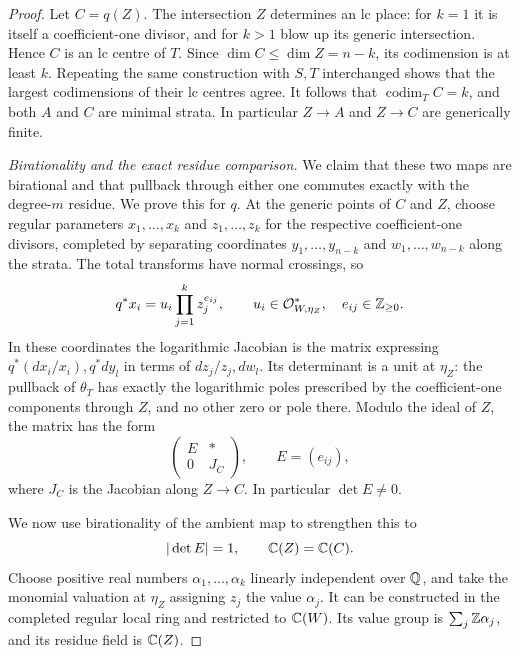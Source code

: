 \begin{proof}
 Let $C=q(Z)$.  The intersection $Z$ determines an lc place: for $k=1$
 it is itself a coefficient-one divisor, and for $k>1$ blow up its
 generic intersection.  Hence $C$ is an lc centre of $T$.  Since
 $\dim C\le\dim Z=n-k$, its codimension is at least $k$.
 Repeating the same construction with $S,T$ interchanged shows that
 the largest codimensions of their lc centres agree.  It follows that
 $\operatorname{codim}_T C=k$, and both $A$ and $C$ are minimal
 strata.  In particular $Z\to A$ and $Z\to C$ are generically finite.

 \emph{Birationality and the exact residue comparison.}
 We claim that these two maps are birational and that pullback through
 either one commutes exactly with the degree-$m$ residue.  We prove
 this for $q$.  At the generic points of $C$ and $Z$, choose regular
 parameters $x_1,\ldots,x_k$ and $z_1,\ldots,z_k$ for the respective
 coefficient-one divisors, completed by separating coordinates
 $y_1,\ldots,y_{n-k}$ and $w_1,\ldots,w_{n-k}$ along the strata.
 The total transforms have normal crossings, so
 \begin{equation}\label{res:monomial}
  q^*x_i=u_i\prod_{j=1}^k z_j^{e_{ij}},
  \qquad u_i\in\mathcal O_{W,\eta_Z}^{*},\quad e_{ij}\in\mathbb Z_{\ge0}.
 \end{equation}
 In these coordinates the logarithmic Jacobian is the matrix
 expressing $q^*(dx_i/x_i),q^*dy_l$ in terms of
 $dz_j/z_j,dw_l$.  Its determinant is a unit at $\eta_Z$: the
 pullback of $\theta_T$ has exactly the logarithmic poles prescribed
 by the coefficient-one components through $Z$, and no other zero
 or pole there.  Modulo the ideal of $Z$, the matrix has the form
 \[
 \begin{pmatrix} E&*\\0&J_C\end{pmatrix},
 \qquad E=(e_{ij}),
 \]
 where $J_C$ is the Jacobian along $Z\to C$.  In particular
 $\det E\ne0$.

 We now use birationality of the ambient map to strengthen this to
 \begin{equation}\label{res:unimodular}
  |\det E|=1,\qquad \mathbb C(Z)=\mathbb C(C).
 \end{equation}
 Choose positive real numbers $\alpha_1,\ldots,\alpha_k$ linearly
 independent over $\mathbb Q$, and take the monomial valuation at
 $\eta_Z$ assigning $z_j$ the value $\alpha_j$.  It can be
 constructed in the completed regular local ring and restricted to
 $\mathbb C(W)$.  Its value group is $\sum_j\mathbb Z\alpha_j$, and its residue
 field is $\mathbb C(Z)$.


\end{proof}
